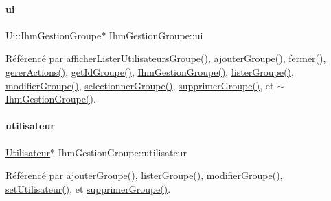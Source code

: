 \paragraph{\texorpdfstring{ui}{ui}}
{\footnotesize\ttfamily Ui\+::\+Ihm\+Gestion\+Groupe$\ast$ Ihm\+Gestion\+Groupe\+::ui\hspace{0.3cm}{\ttfamily [private]}}



Référencé par \hyperlink{class_ihm_gestion_groupe_a491098bb1e69aa1c09b76c3459da067f}{afficher\+Lister\+Utilisateurs\+Groupe()}, \hyperlink{class_ihm_gestion_groupe_a5e5b11cb395970f64b30427ccb2ecf4d}{ajouter\+Groupe()}, \hyperlink{class_ihm_gestion_groupe_af45013ab7614dbe037025efd6884907f}{fermer()}, \hyperlink{class_ihm_gestion_groupe_a9e6a325b8845fb3c22157b2b59436610}{gerer\+Actions()}, \hyperlink{class_ihm_gestion_groupe_a0f6dd8f645a5bf789521a25322004146}{get\+Id\+Groupe()}, \hyperlink{class_ihm_gestion_groupe_a27632f9cf5b66f4403c3534ee0e0ad18}{Ihm\+Gestion\+Groupe()}, \hyperlink{class_ihm_gestion_groupe_a7afabe81c405b35e7cfd4e760eda8c84}{lister\+Groupe()}, \hyperlink{class_ihm_gestion_groupe_a810c186bf38dab776c7167c85671b268}{modifier\+Groupe()}, \hyperlink{class_ihm_gestion_groupe_a322f2c8584ae8e5be7f2075b73905beb}{selectionner\+Groupe()}, \hyperlink{class_ihm_gestion_groupe_a08bdd132a37ac574b15d00e4dc959d7f}{supprimer\+Groupe()}, et \hyperlink{class_ihm_gestion_groupe_aba32d8b8ea5b7d31232d41ae051ebcb7}{$\sim$\+Ihm\+Gestion\+Groupe()}.

\mbox{\label{class_ihm_gestion_groupe_a87b9d242561e8bf7765aa14a5e124db1}} 
\paragraph{\texorpdfstring{utilisateur}{utilisateur}}
{\footnotesize\ttfamily \hyperlink{class_utilisateur}{Utilisateur}$\ast$ Ihm\+Gestion\+Groupe\+::utilisateur\hspace{0.3cm}{\ttfamily [private]}}



Référencé par \hyperlink{class_ihm_gestion_groupe_a5e5b11cb395970f64b30427ccb2ecf4d}{ajouter\+Groupe()}, \hyperlink{class_ihm_gestion_groupe_a7afabe81c405b35e7cfd4e760eda8c84}{lister\+Groupe()}, \hyperlink{class_ihm_gestion_groupe_a810c186bf38dab776c7167c85671b268}{modifier\+Groupe()}, \hyperlink{class_ihm_gestion_groupe_a88bbe8b5652781d4a80a50ed6bf9d329}{set\+Utilisateur()}, et \hyperlink{class_ihm_gestion_groupe_a08bdd132a37ac574b15d00e4dc959d7f}{supprimer\+Groupe()}.

